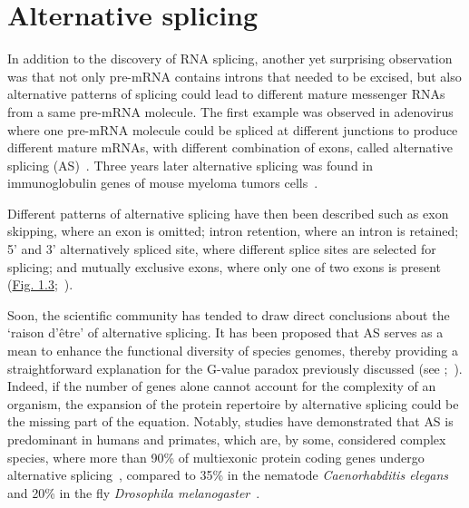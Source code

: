 \section{Alternative splicing}

In addition to the discovery of RNA splicing, another yet surprising observation was that not only pre-\acrshort{mRNA} contains introns that needed to be excised, but also alternative patterns of splicing could lead to different mature messenger \acrshort{RNA}s from a same pre-\acrshort{mRNA} molecule. The first example was observed in adenovirus where one pre-\acrshort{mRNA} molecule could be spliced at different junctions to produce different mature \acrshort{mRNA}s, with different combination of exons, called alternative splicing (\acrshort{AS})~\citep{berget_spliced_1977, berk_discovery_2016}. Three years later alternative splicing was found in immunoglobulin genes of mouse myeloma tumors cells~\citep{early_two_1980}.

Different patterns of alternative splicing have then been described such as exon skipping, where an exon is omitted; intron retention, where an intron is retained; 5' and 3' alternatively spliced site, where different splice sites are selected for splicing; and mutually exclusive exons, where only one of two exons is present (\hyperref[fig:asevents]{Fig. 1.3};~\citet{wang_splicing_2008}).

Soon, the scientific community has tended to draw direct conclusions about the `raison d'être' of alternative splicing. It has been proposed that \acrshort{AS} serves as a mean to enhance the functional diversity of species genomes, thereby providing a straightforward explanation for the G-value paradox previously discussed (see ;~\citet{graveley_alternative_2001}). Indeed, if the number of genes alone cannot account for the complexity of an organism, the expansion of the protein repertoire by alternative splicing could be the missing part of the equation. %
Notably, studies have demonstrated that \acrshort{AS} is predominant in humans and primates, which are, by some, considered complex species, where more than 90\% of multiexonic protein coding genes undergo alternative splicing~\citep{wang_alternative_2008, pan_deep_2008}, compared to 35\% in the nematode \textit{Caenorhabditis elegans} and 20\% in the fly \textit{Drosophila melanogaster}~\citep{chen_correcting_2014}.


